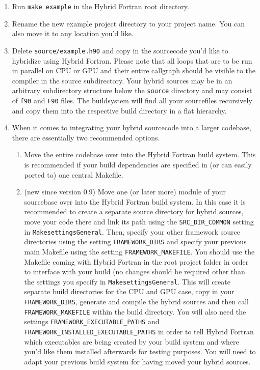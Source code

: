 {\begin{enumerate}
 \item Run \verb|make example| in the Hybrid Fortran root directory.
 \item Rename the new example project directory to your project name. You can also move it to any location you'd like.
 \item Delete \verb|source/example.h90| and copy in the sourcecode you'd like to hybridize using Hybrid Fortran. Please note that all loops that are to be run in parallel on CPU or GPU and their entire callgraph should be visible to the compiler in the source subdirectory. Your hybrid sources may be in an arbitrary subdirectory structure below the \verb|source| directory and may consist of \verb|f90| and \verb|F90| files. The buildsystem will find all your sourcefiles recursively and copy them into the respective build directory in a flat hierarchy.
 \item When it comes to integrating your hybrid sourcecode into a larger codebase, there are essentially two recommended options.
   \begin{enumerate}
     \item \label{enum:entireCodebase} Move the entire codebase over into the Hybrid Fortran build system. This is recommended if your build dependencies are specified in (or can easily ported to) one central Makefile.
     \item \label{enum:partOfFramework} (new since version 0.9) Move one (or later more) module of your sourcebase over into the Hybrid Fortran build system. In this case it is recommended to create a separate source directory for hybrid sources, move your code there and link its path using the \verb|SRC_DIR_COMMON| setting in \verb|MakesettingsGeneral|. Then, specify your other framework source directories using the setting \verb|FRAMEWORK_DIRS| and specify your previous main Makefile using the setting \verb|FRAMEWORK_MAKEFILE|. You should use the Makefile coming with Hybrid Fortran in the root project folder in order to interface with your build (no changes should be required other than the settings you specify in \verb|MakesettingsGeneral|. This will create separate build directories for the CPU and GPU case, copy in your \verb|FRAMEWORK_DIRS|, generate and compile the hybrid sources and then call \verb|FRAMEWORK_MAKEFILE| within the build directory. You will also need the settings \verb|FRAMEWORK_EXECUTABLE_PATHS| and \verb|FRAMEWORK_INSTALLED_EXECUTABLE_PATHS| in order to tell Hybrid Fortran which executables are being created by your build system and where you'd like them installed afterwards for testing purposes. You will need to adapt your previous build system for having moved your hybrid sources.

\end{enumerate}
\end{enumerate}}
